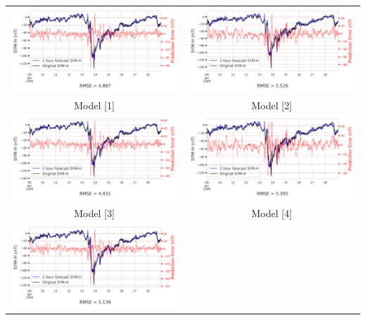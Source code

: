 \documentclass[draft,sw]{agutexSI2019}
\begin{document}
\begin{table}
\centering
\begin{tabular}{cc}
\includegraphics[width=0.49\linewidth]{paper_plots/1h_swics/1h_swics_storm_28.png}
&
\includegraphics[width=0.49\linewidth]{paper_plots/2h_swics/2h_swics_storm_28.png}
\\
Model [1] & Model [2]
\vspace*{12pt}
\\
\includegraphics[width=0.49\linewidth]{paper_plots/1h_no_swics/1h_no_swics_storm_28.png}
&
\includegraphics[width=0.49\linewidth]{paper_plots/2h_no_swics/2h_no_swics_storm_28.png}
\\
Model [3] & Model [4]
\vspace*{12pt}
\\
\includegraphics[width=0.49\linewidth]{paper_plots/1h_swics_model_on_no_swics/1h_swics_model_on_no_swics_storm_28.png}

\end{tabular}
\end{table}
\end{document}

